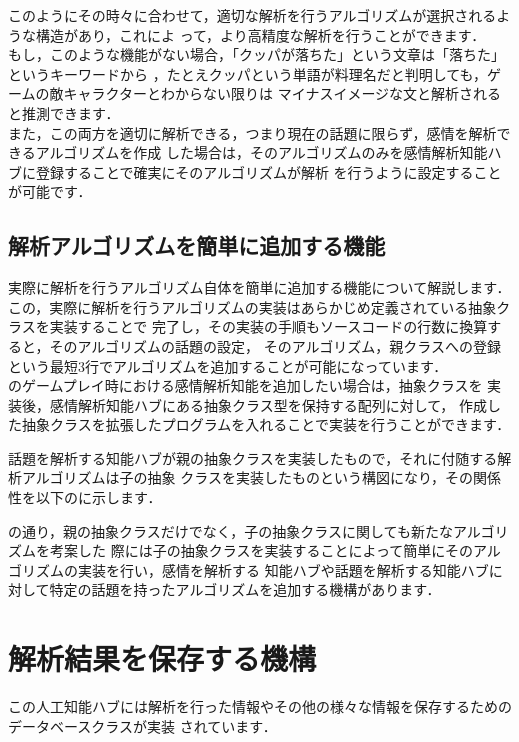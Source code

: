 このようにその時々に合わせて，適切な解析を行うアルゴリズムが選択されるような構造があり，これによ
って，より高精度な解析を行うことができます．
\\
もし，このような機能がない場合，「クッパが落ちた」という文章は「落ちた」というキーワードから
，たとえクッパという単語が料理名だと判明しても，ゲームの敵キャラクターとわからない限りは
マイナスイメージな文と解析されると推測できます．
\\

また，この両方を適切に解析できる，つまり現在の話題に限らず，感情を解析できるアルゴリズムを作成
した場合は，そのアルゴリズムのみを感情解析知能ハブに登録することで確実にそのアルゴリズムが解析
を行うように設定することが可能です．

\subsection{解析アルゴリズムを簡単に追加する機能}
実際に解析を行うアルゴリズム自体を簡単に追加する機能について解説します．\\
この，実際に解析を行うアルゴリズムの実装はあらかじめ定義されている抽象クラスを実装することで
完了し，その実装の手順もソースコードの行数に換算すると，そのアルゴリズムの話題の設定，
そのアルゴリズム，親クラスへの登録という最短3行でアルゴリズムを追加することが可能になっています．\\

のゲームプレイ時における感情解析知能を追加したい場合は，抽象クラスを
実装後，感情解析知能ハブにある抽象クラス型を保持する配列に対して，
作成した抽象クラスを拡張したプログラムを入れることで実装を行うことができます．

話題を解析する知能ハブが親の抽象クラスを実装したもので，それに付随する解析アルゴリズムは子の抽象
クラスを実装したものという構図になり，その関係性を以下のに示します．
\\

の通り，親の抽象クラスだけでなく，子の抽象クラスに関しても新たなアルゴリズムを考案した
際には子の抽象クラスを実装することによって簡単にそのアルゴリズムの実装を行い，感情を解析する
知能ハブや話題を解析する知能ハブに対して特定の話題を持ったアルゴリズムを追加する機構があります．

\newpage

\section{解析結果を保存する機構}
この人工知能ハブには解析を行った情報やその他の様々な情報を保存するためのデータベースクラスが実装
されています．\\

